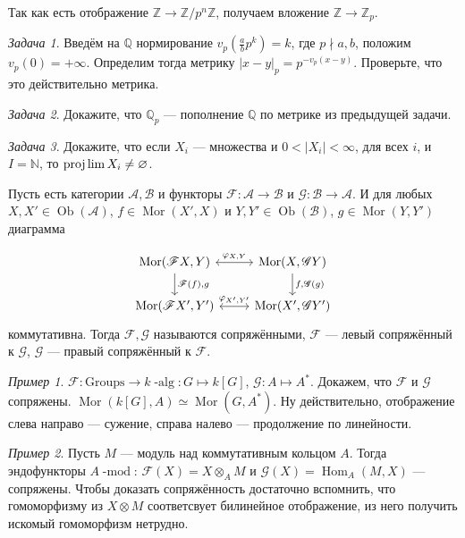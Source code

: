 \documentclass{article}
\theoremstyle{definition}
\theoremstyle{remark}
\newtheorem*{example}{Пример}
\newtheorem{prb}{Задача}
\newenvironment{problem}
{\begin{prb}
\label{\theprb}}
{\end{prb}}
\DeclareMathOperator{\Hom}{Hom}
\DeclareMathOperator{\Mor}{Mor}
\DeclareMathOperator{\Ob}{Ob}
\newcommand{\Z}{\mathbb{Z}}
\newcommand{\Q}{\mathbb{Q}}
\newcommand{\A}{\mathcal{A}}
\newcommand{\B}{\mathcal{B}}
\newcommand{\F}{\mathscr{F}}
\newcommand{\G}{\mathscr{G}}
\begin{document}
Так как есть отображение $\Z \rightarrow \Z / p^n \Z$, получаем вложение $\Z \rightarrow \Z_p$.

\begin{problem}
	Введём на $\Q$ нормирование $v_p(\frac{a}{b}p^k) = k$, где $p \nmid a, b$, положим $v_p(0) = +\infty$. Определим тогда метрику $|x - y|_p = p^{-v_p(x - y)}$. Проверьте, что это действительно метрика.
\end{problem}
\begin{problem}
	Докажите, что $\Q_p$ --- пополнение $\Q$ по метрике из предыдущей задачи.
\end{problem}
\begin{problem}
	Докажите, что если $X_i$ --- множества и $0 < |X_i| < \infty$, для всех $i$, и $I = \mathbb{N}$, то $\projlim X_i \neq \varnothing$.
\end{problem}

Пусть есть категории $\A, \B$ и функторы $\F: \A \rightarrow \B$ и $\G: \B \rightarrow \A$. И для любых $X, X' \in \Ob(\A)$, $f \in \Mor(X', X)$ и $Y, Y' \in \Ob(\B)$, $g \in \Mor(Y, Y')$ диаграмма

\begin{equation*}
\begin{tikzcd}
\Mor(\F X, Y) \rar[leftrightarrow]{\varphi_{X, Y}} \dar{\F(f), g} & \Mor(X, \G Y) \dar{f, \G(g)} \\
\Mor(\F X', Y') \rar[leftrightarrow]{\varphi_{X', Y'}} & \Mor(X', \G Y')
\end{tikzcd}
\end{equation*}
коммутативна. Тогда $\F, \G$ называются сопряжёнными, $\F$ --- левый сопряжённый к $\G$, $\G$ --- правый сопряжённый к $\F$.

\begin{example}
	$\F: \mathrm{Groups} \rightarrow k\operatorname{-alg}: G \mapsto k[G]$, $\G: A \mapsto A^*$. Докажем, что $\F$ и $\G$ сопряжены. $\Mor(k[G], A) \simeq \Mor(G, A^*)$. Ну действительно, отображение слева направо --- сужение, справа налево --- продолжение по линейности.
\end{example}

\begin{example}
Пусть $M$ --- модуль над коммутативным кольцом $A$. Тогда эндофункторы $A\operatorname{-mod}$: $\F(X) = X \otimes_A M$ и $\G(X) = \Hom_A(M, X)$ --- сопряжены. Чтобы доказать сопряжённость достаточно вспомнить, что гомоморфизму из $X \otimes M$ соответсвует билинейное отображение, из него получить искомый гомоморфизм нетрудно.
\end{example}
\end{document}
